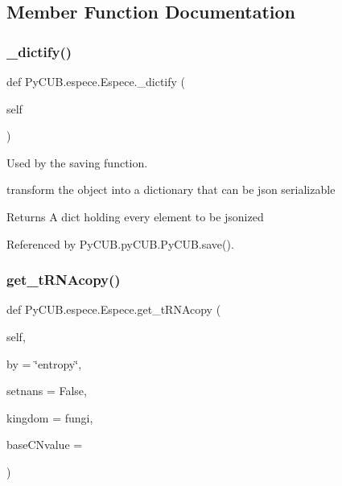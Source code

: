 \subsection{Member Function Documentation}
\mbox{\label{class_py_c_u_b_1_1espece_1_1_espece_a4edfabc363a5d4be437afb94f5d03368}} 
\subsubsection{\texorpdfstring{\+\_\+dictify()}{\_dictify()}}
{\footnotesize\ttfamily def Py\+C\+U\+B.\+espece.\+Espece.\+\_\+dictify (\begin{DoxyParamCaption}\item[{}]{self }\end{DoxyParamCaption})\hspace{0.3cm}{\ttfamily [private]}}



Used by the saving function. 

transform the object into a dictionary that can be json serializable

\begin{DoxyReturn}{Returns}
A dict holding every element to be jsonized 
\end{DoxyReturn}


Referenced by Py\+C\+U\+B.\+py\+C\+U\+B.\+Py\+C\+U\+B.\+save().

\mbox{\label{class_py_c_u_b_1_1espece_1_1_espece_afa35655bb969cbc02456aa74228a1b8d}} 
\subsubsection{\texorpdfstring{get\+\_\+t\+R\+N\+Acopy()}{get\_tRNAcopy()}}
{\footnotesize\ttfamily def Py\+C\+U\+B.\+espece.\+Espece.\+get\+\_\+t\+R\+N\+Acopy (\begin{DoxyParamCaption}\item[{}]{self,  }\item[{}]{by = {\ttfamily \char`\"{}entropy\char`\"{}},  }\item[{}]{setnans = {\ttfamily False},  }\item[{}]{kingdom = {\ttfamily \textquotesingle{}fungi\textquotesingle{}},  }\item[{}]{base\+C\+Nvalue = {} }\end{DoxyParamCaption})}



